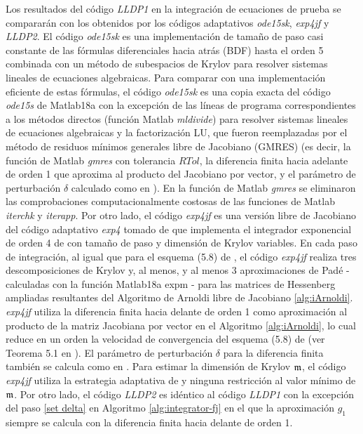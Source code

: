 Los resultados del código \emph{LLDP1} en la integración de ecuaciones de prueba se compararán con los obtenidos por los códigos adaptativos \emph{ode15sk}, \emph{exp4jf} y \emph{LLDP2}. El código \emph{ode15sk} es una implementación de tamaño de paso casi constante de las fórmulas diferenciales hacia atrás (BDF) hasta el orden 5 combinada con un método de subespacios de Krylov para resolver sistemas lineales de ecuaciones algebraicas. Para comparar con una implementación eficiente de estas fórmulas, el código \emph{ode15sk} es una copia exacta del código \emph{ode15s} \cite{shampine1997matlab} de Matlab18a con la excepción de las líneas de programa correspondientes a los métodos directos (función Matlab \emph{mldivide}) para resolver sistemas lineales de ecuaciones algebraicas y la factorización LU, que fueron reemplazadas por el método de residuos mínimos generales libre de Jacobiano (GMRES) (es decir, la función de Matlab \emph{gmres} con tolerancia $RTol$, la diferencia finita  hacia adelante de orden 1 que aproxima al producto del Jacobiano por  vector, y el parámetro de perturbación $\delta$ calculado como en \cite{knoll2004jacobian}). En la función de Matlab \emph{gmres} se eliminaron las comprobaciones computacionalmente costosas de las funciones de Matlab \emph{iterchk} y \emph{iterapp}. Por otro lado, el código \emph{exp4jf} es una versión libre de Jacobiano del código adaptativo \emph{exp4} tomado de \cite{jansing2011expode} que implementa el integrador exponencial de orden 4 de \cite{hochbruck1998exponential} con tamaño de paso y dimensión de Krylov variables.
En cada paso de integración, al igual que para el esquema (5.8) de \cite{hochbruck1998exponential}, el código \textit{exp4jf} realiza tres descomposiciones de Krylov y, al menos, y al menos 3 aproximaciones de Padé - calculadas con la función Matlab18a expm - para las matrices de Hessenberg ampliadas resultantes del Algoritmo de Arnoldi libre de Jacobiano \ref{alg:iArnoldi}. \textit{exp4jf} utiliza la diferencia finita hacia delante de orden 1 como aproximación al producto de la matriz Jacobiana por vector en el Algoritmo \ref{alg:iArnoldi}, lo cual reduce en un orden la velocidad de convergencia del esquema (5.8) de \cite{hochbruck1998exponential} (ver Teorema 5.1 en \cite{hochbruck1998exponential}).
El parámetro de perturbación $\delta$ para la diferencia finita también se calcula como en \cite{knoll2004jacobian}. Para estimar la dimensión de Krylov $\mathfrak{m}$, el código \textit{exp4jf} utiliza la estrategia adaptativa de \cite{hochbruck1998exponential} y ninguna restricción al valor mínimo de $\mathfrak{m}$. Por otro lado, el código \emph{LLDP2} es idéntico al código \emph{LLDP1} con la excepción del paso \ref{set delta} en Algoritmo \ref{alg:integrator-fj} en el que la aproximación $g_1$ siempre se calcula con la diferencia finita hacia delante de orden 1. 


